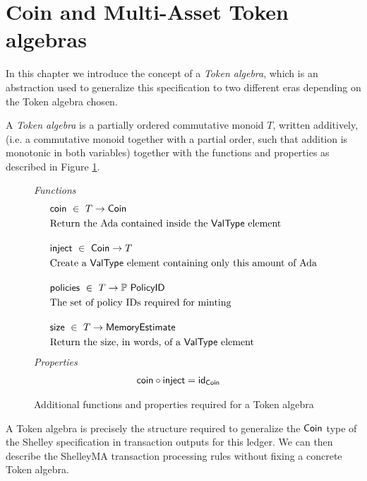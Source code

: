 \section{Coin and Multi-Asset Token algebras}
\label{sec:coin-ma}

In this chapter we introduce the concept of a \emph{Token algebra},
which is an abstraction used to generalize this specification to two
different eras depending on the Token algebra chosen.

\begin{definition}
  A \emph{Token algebra} is a partially ordered commutative monoid
  $T$, written additively, (i.e. a commutative monoid together with a
  partial order, such that addition is monotonic in both variables)
  together with the functions and properties as described in Figure
  \ref{fig:TokenAlgebra}.
\end{definition}

\begin{figure}[htb]
  \emph{Functions}
  \begin{align*}
      & \fun{coin} ~\in~ T \to \Coin\\
      & \text{Return the Ada contained inside the $\mathsf{ValType}$ element}
      \nextdef
      & \fun{inject} ~\in~ \Coin \to T\\
      & \text{Create a $\mathsf{ValType}$ element containing only this amount of Ada}
      \nextdef
      & \fun{policies} ~\in~ T \to \powerset{\PolicyID} \\
      & \text{The set of policy IDs required for minting}
      \nextdef
      & \fun{size} ~\in~ T \to \MemoryEstimate\\
      & \text{Return the size, in words, of a $\mathsf{ValType}$ element}
  \end{align*}
  \emph{Properties}
  \begin{align*}
      & \mathsf{coin} \circ \mathsf{inject} = \mathsf{id}_{\mathsf{Coin}}
  \end{align*}
  \caption{Additional functions and properties required for a Token algebra}
  \label{fig:TokenAlgebra}
\end{figure}

A Token algebra is precisely the structure required to generalize the
$\mathsf{Coin}$ type of the Shelley specification in transaction outputs for
this ledger. We can then describe the ShelleyMA
transaction processing rules without fixing a concrete Token algebra.

